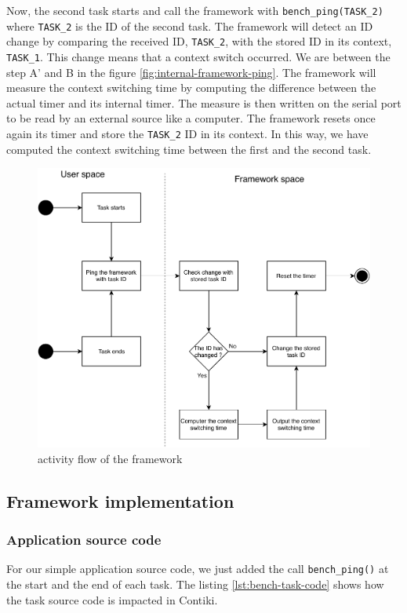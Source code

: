 Now, the second task starts and call the framework with \texttt{bench\_ping(TASK\_2)} where \texttt{TASK\_2} is the ID of the second task.
The framework will detect an ID change by comparing the received ID, \texttt{TASK\_2}, with the stored ID in its context, \texttt{TASK\_1}.
This change means that a context switch occurred.
We are between the step A' and B in the figure \ref{fig:internal-framework-ping}.
The framework will measure the context switching time by computing the difference between the actual timer and its internal timer.
The measure is then written on the serial port to be read by an external source like a computer.
The framework resets once again its timer and store the \texttt{TASK\_2} ID in its context.
In this way, we have computed the context switching time between the first and the second task.

\begin{figure}[!ht]
  \centering
  \includegraphics[scale=0.7]{assets/extension-activity-framework.pdf}
  \caption{activity flow of the framework\label{fig:extension-activity-framework}}
\end{figure}

\subsection{Framework implementation}

\subsubsection{Application source code}
For our simple application source code, we just added the call \texttt{bench\_ping()} at the start and the end of each task.
The listing \ref{lst:bench-task-code} shows how the task source code is impacted in Contiki.

